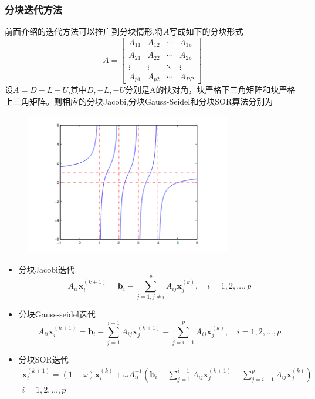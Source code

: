 \documentclass[12pt,a4paper]{article}
\begin{document}
\subsubsection{分块迭代方法}
前面介绍的迭代方法可以推广到分块情形.将$A$写成如下的分块形式
$$
A=\left[\begin{array}{cccc}{A_{11}} & {A_{12}} & {\cdots} & {A_{1 p}} \\ {A_{21}} & {A_{22}} & {\cdots} & {A_{2 p}} \\ {\vdots} & {\vdots} & {\ddots} & {\vdots} \\ {A_{p 1}} & {A_{p 2}} & {\cdots} & {A_{P P}}\end{array}\right]
$$
设$A=D-L-U$,其中$D,-L,-U$分别是A的快对角，块严格下三角矩阵和块严格上三角矩阵。则相应的分块Jacobi,分块Gauss-Seidel和分块SOR算法分别为
\begin{figure}[h]
\includegraphics[width=0.8\textwidth]{figurest/figure_2.png} 
\end{figure}
\begin{itemize}
\item {\color{blue}分块Jacobi迭代}$$
A_{i i} \boldsymbol{x}_{i}^{(k+1)}=\boldsymbol{b}_{i}-\sum_{j=1, j \neq i}^{p} A_{i j} \boldsymbol{x}_{j}^{(k)}, \quad i=1,2, \ldots, p
$$
\item {\color{blue}分块Gauss-seidel迭代}$$
A_{i i} \boldsymbol{x}_{i}^{(k+1)}=\boldsymbol{b}_{i}-\sum_{j=1}^{i-1} A_{i j} \boldsymbol{x}_{j}^{(k+1)}-\sum_{j=i+1}^{p} A_{i j} \boldsymbol{x}_{j}^{(k)}, \quad i=1,2, \ldots, p
$$
\item {\color{blue}分块SOR迭代}$$
\begin{array}{c}{\boldsymbol{x}_{i}^{(k+1)}=(1-\omega) \boldsymbol{x}_{i}^{(k)}+\omega A_{i i}^{-1}\left(\boldsymbol{b}_{i}-\sum_{j=1}^{i-1} A_{i j} \boldsymbol{x}_{j}^{(k+1)}-\sum_{j=i+1}^{p} A_{i j} \boldsymbol{x}_{j}^{(k)}\right)} \\ {i=1,2, \ldots, p}\end{array}
$$
\end{itemize}
\end{document}

